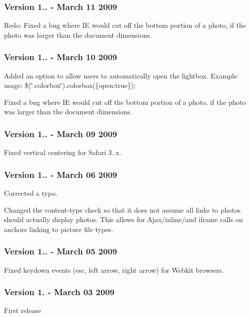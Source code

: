 \subsubsection*{Version 1.. -\/ March 11 2009}


\begin{DoxyItemize}
\item Redo\-: Fixed a bug where I\-E would cut off the bottom portion of a photo, if the photo was larger than the document dimensions.
\end{DoxyItemize}

\subsubsection*{Version 1.. -\/ March 10 2009}


\begin{DoxyItemize}
\item Added an option to allow users to automatically open the lightbox. Example usage\-: \$(\char`\"{}.\-colorbox\char`\"{}).colorbox(\{open\-:true\});
\item Fixed a bug where I\-E would cut off the bottom portion of a photo, if the photo was larger than the document dimensions.
\end{DoxyItemize}

\subsubsection*{Version 1.. -\/ March 09 2009}


\begin{DoxyItemize}
\item Fixed vertical centering for Safari 3..\-x.
\end{DoxyItemize}

\subsubsection*{Version 1.. -\/ March 06 2009}


\begin{DoxyItemize}
\item Corrected a typo.
\item Changed the content-\/type check so that it does not assume all links to photos should actually display photos. This allows for Ajax/inline/and iframe calls on anchors linking to picture file types.
\end{DoxyItemize}

\subsubsection*{Version 1.. -\/ March 05 2009}


\begin{DoxyItemize}
\item Fixed keydown events (esc, left arrow, right arrow) for Webkit browsers.
\end{DoxyItemize}

\subsubsection*{Version 1. -\/ March 03 2009}


\begin{DoxyItemize}
\item First release 
\end{DoxyItemize}